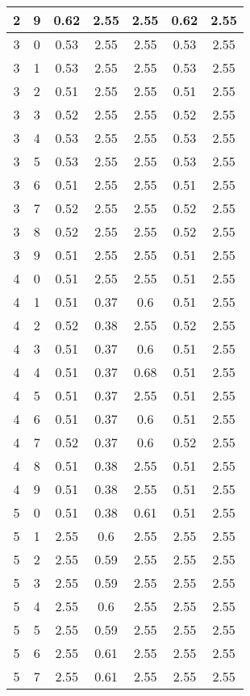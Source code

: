 \begin{longtable}{|c|c||c||c|c||c|c|}
	2 & 9 & 0.62 & 2.55 & 2.55 & 0.62 & 2.55 \\ \hline
	3 & 0 & 0.53 & 2.55 & 2.55 & 0.53 & 2.55 \\ \hline
	3 & 1 & 0.53 & 2.55 & 2.55 & 0.53 & 2.55 \\ \hline
	3 & 2 & 0.51 & 2.55 & 2.55 & 0.51 & 2.55 \\ \hline
	3 & 3 & 0.52 & 2.55 & 2.55 & 0.52 & 2.55 \\ \hline
	3 & 4 & 0.53 & 2.55 & 2.55 & 0.53 & 2.55 \\ \hline
	3 & 5 & 0.53 & 2.55 & 2.55 & 0.53 & 2.55 \\ \hline
	3 & 6 & 0.51 & 2.55 & 2.55 & 0.51 & 2.55 \\ \hline
	3 & 7 & 0.52 & 2.55 & 2.55 & 0.52 & 2.55 \\ \hline
	3 & 8 & 0.52 & 2.55 & 2.55 & 0.52 & 2.55 \\ \hline
	3 & 9 & 0.51 & 2.55 & 2.55 & 0.51 & 2.55 \\ \hline
	4 & 0 & 0.51 & 2.55 & 2.55 & 0.51 & 2.55 \\ \hline
	4 & 1 & 0.51 & 0.37 & 0.6 & 0.51 & 2.55 \\ \hline
	4 & 2 & 0.52 & 0.38 & 2.55 & 0.52 & 2.55 \\ \hline
	4 & 3 & 0.51 & 0.37 & 0.6 & 0.51 & 2.55 \\ \hline
	4 & 4 & 0.51 & 0.37 & 0.68 & 0.51 & 2.55 \\ \hline
	4 & 5 & 0.51 & 0.37 & 2.55 & 0.51 & 2.55 \\ \hline
	4 & 6 & 0.51 & 0.37 & 0.6 & 0.51 & 2.55 \\ \hline
	4 & 7 & 0.52 & 0.37 & 0.6 & 0.52 & 2.55 \\ \hline
	4 & 8 & 0.51 & 0.38 & 2.55 & 0.51 & 2.55 \\ \hline
	4 & 9 & 0.51 & 0.38 & 2.55 & 0.51 & 2.55 \\ \hline
	5 & 0 & 0.51 & 0.38 & 0.61 & 0.51 & 2.55 \\ \hline
	5 & 1 & 2.55 & 0.6 & 2.55 & 2.55 & 2.55 \\ \hline
	5 & 2 & 2.55 & 0.59 & 2.55 & 2.55 & 2.55 \\ \hline
	5 & 3 & 2.55 & 0.59 & 2.55 & 2.55 & 2.55 \\ \hline
	5 & 4 & 2.55 & 0.6 & 2.55 & 2.55 & 2.55 \\ \hline
	5 & 5 & 2.55 & 0.59 & 2.55 & 2.55 & 2.55 \\ \hline
	5 & 6 & 2.55 & 0.61 & 2.55 & 2.55 & 2.55 \\ \hline
	5 & 7 & 2.55 & 0.61 & 2.55 & 2.55 & 2.55 \\ \hline

\end{longtable}
